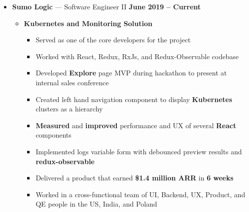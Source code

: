 \documentclass[10pt, oneside]{letter}
\begin{document}
    \begin{adjustwidth}{0.1in}{0pt}

      \begin{itemize}
        \item
          \textbf{Sumo Logic} --- Software Engineer II \hfill \textbf{June 2019 -- Current}
            \begin{itemize}
              \item{\textbf{Kubernetes and Monitoring Solution}}
                \begin{itemize}
                  \item Served as one of the core developers for the project
                  \item Worked with React, Redux, RxJs, and Redux-Observable codebase
                  \item {
                      Developed \textbf{Explore} page MVP during hackathon to
                      present at internal sales conference
                  }
                  \item {
                      Created left hand navigation component to display
                      \textbf{Kubernetes} clusters as a hierarchy
                  }
                  \item {
                      \textbf{Measured} and \textbf{improved} performance and
                      UX of several \textbf{React} components
                  }
                  \item {
                      Implemented logs variable form with debounced preview
                      results and \textbf{redux-observable}
                  }
                  \item {
                      Delivered a product that earned \textbf{\$1.4 million
                        ARR} in \textbf{6 weeks}
                  }
                  \item {
                      Worked in a cross-functional team of UI, Backend, UX,
                      Product, and QE people in the US, India, and Poland
                  }
                \end{itemize}


\end{itemize}
\end{itemize}
\end{adjustwidth}
\end{document}
